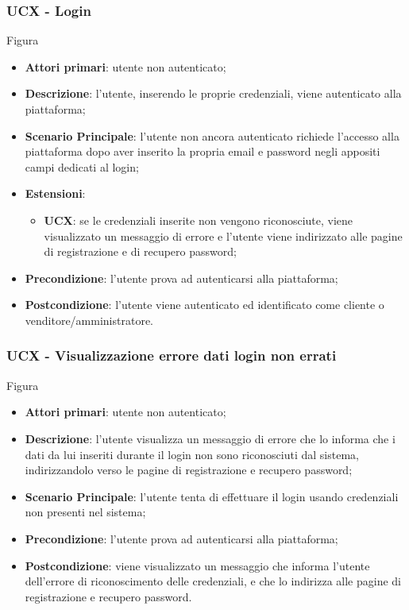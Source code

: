 \subsubsection{UCX - Login}
Figura \\
\begin{itemize}
\item \textbf{Attori primari}: utente non autenticato;
\item \textbf{Descrizione}: l'utente, inserendo le proprie credenziali, viene autenticato alla piattaforma;
\item \textbf{Scenario Principale}: l'utente non ancora autenticato richiede l'accesso alla piattaforma dopo aver inserito la propria email e password negli appositi campi dedicati al login;
\item \textbf{Estensioni}:
\begin{itemize}
\item \textbf{UCX}: se le credenziali inserite non vengono riconosciute, viene visualizzato un messaggio di errore e l'utente viene indirizzato alle pagine di registrazione e di recupero password;
\end{itemize}
\item \textbf{Precondizione}: l'utente prova ad autenticarsi alla piattaforma;
\item \textbf{Postcondizione}: l'utente viene autenticato ed identificato come cliente o venditore/amministratore.
\end{itemize}

\subsubsection{UCX - Visualizzazione errore dati login non errati}
Figura \\
\begin{itemize}
\item \textbf{Attori primari}: utente non autenticato;
\item \textbf{Descrizione}: l'utente visualizza un messaggio di errore che lo informa che i dati da lui inseriti durante il login non sono riconosciuti dal sistema, indirizzandolo verso le pagine di registrazione e recupero password;
\item \textbf{Scenario Principale}: l'utente tenta di effettuare il login usando credenziali non presenti nel sistema;
\item \textbf{Precondizione}: l'utente prova ad autenticarsi alla piattaforma;
\item \textbf{Postcondizione}: viene visualizzato un messaggio che informa l'utente dell'errore di riconoscimento delle credenziali, e che lo indirizza alle pagine di registrazione e recupero password.
\end{itemize}

